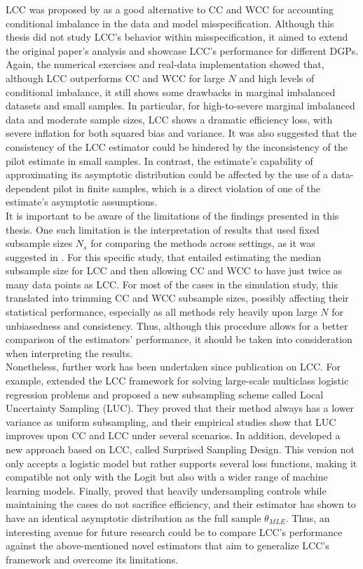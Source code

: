 LCC was proposed by \textcite{hastie2014} as a good alternative to CC and WCC for accounting conditional imbalance in the data and model misspecification. Although this thesis did not study LCC's behavior within misspecification, it aimed to extend the original paper's analysis and showcase LCC's performance for different DGPs. Again, the numerical exercises and real-data implementation showed that, although LCC outperforms CC and WCC for large $N$ and high levels of conditional imbalance, it still shows some drawbacks in marginal imbalanced datasets and small samples. In particular, for high-to-severe marginal imbalanced data and moderate sample sizes, LCC shows a dramatic efficiency loss, with severe inflation for both squared bias and variance. It was also suggested that the consistency of the LCC estimator could be hindered by the inconsistency of the pilot estimate in small samples. In contrast, the estimate's capability of approximating its asymptotic distribution could be affected by the use of a data-dependent pilot in finite samples, which is a direct violation of one of the estimate's asymptotic assumptions.\\

It is important to be aware of the limitations of the findings presented in this thesis. One such limitation is the interpretation of results that used fixed subsample sizes $N_s$ for comparing the methods across settings, as it was suggested in \textcite{hastie2014}. For this specific study, that entailed estimating the median subsample size for LCC and then allowing CC and WCC to have just twice as many data points as LCC. For most of the cases in the simulation study, this translated into trimming CC and WCC subsample sizes, possibly affecting their statistical performance, especially as all methods rely heavily upon large $N$ for unbiasedness and consistency. Thus, although this procedure allows for a better comparison of the estimators' performance, it should be taken into consideration when interpreting the results. \\

Nonetheless, further work has been undertaken since \textcite{hastie2014} publication on LCC. For example, \textcite{han2020local} extended the LCC framework for solving large-scale multiclass logistic regression problems and proposed a new subsampling scheme called Local Uncertainty Sampling (LUC). They proved that their method always has a lower variance as uniform subsampling, and their empirical studies show that LUC improves upon CC and LCC under several scenarios. In addition, \cite{shen2021surprise} developed a new approach based on LCC, called Surprised Sampling Design. This version not only accepts a logistic model but rather supports several loss functions, making it compatible not only with the Logit but also with a wider range of machine learning models. Finally, \textcite{wang2020rare} proved that heavily undersampling controls while maintaining the cases do not sacrifice efficiency, and their estimator has shown to have an identical asymptotic distribution as the full sample $\theta_{MLE}$. Thus, an interesting avenue for future research could be to compare LCC's performance against the above-mentioned novel estimators that aim to generalize LCC's framework and overcome its limitations.

